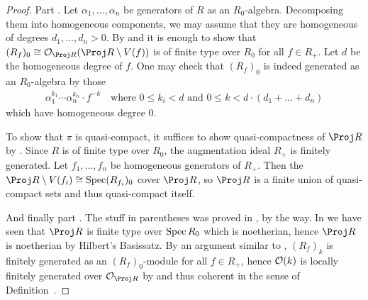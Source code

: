 \documentclass[a4paper,parskip=half,numbers=enddot, DIV=12]{scrreprt}
\renewcommand{\leq}{\leqslant}
\begin{document}
\begin{proof}
	Part . Let $\alpha_1,\ldots,\alpha_n$ be generators of $R$ as an $R_0$-algebra. Decomposing them into homogeneous components, we may assume that they are homogeneous of degrees $d_1,\ldots,d_n>0$. By \cite[Proposition~2.2.1]{alggeo1}  and  it is enough to show that $(R_f)_0\cong\Oo_{\Proj R}(\Proj R\setminus V(f))$ is of finite type over $R_0$ for all $f\in R_+$. Let $d$ be the homogeneous degree of $f$. One may check that $(R_f)_0$ is indeed generated as an $R_0$-algebra by those
	\begin{align*}
	\alpha_1^{k_1}\cdots \alpha_n^{k_n}\cdot f^{-k}\quad\text{where }0\leq k_i<d\text{ and }0\leq k<d\cdot(d_1+\ldots+d_n)
	\end{align*}
	which have homogeneous degree $0$. 
	
	To show that $\pi$ is quasi-compact, it suffices to show quasi-compactness of $\Proj R$ by \cite[Fact~2.1.2]{alggeo1}. Since $R$ is of finite type over $R_0$, the augmentation ideal $R_+$ is finitely generated. Let $f_1,\ldots,f_n$ be homogeneous generators of $R_+$. Then the $\Proj R\setminus V(f_i)\cong \Spec (R_{f_i})_0$ cover $\Proj R$, so $\Proj R$ is a finite union of quasi-compact sets and thus quasi-compact itself.
	
	And finally part . The stuff in parentheses was proved in \cite[Proposition~2.2.1]{alg2}, by the way. In  we have seen that $\Proj R$ is finite type over $\operatorname{Spec} R_0$ which is noetherian, hence $\Proj R$ is noetherian by Hilbert's Basissatz. By an argument similar to , $(R_f)_k$ is finitely generated as an $(R_f)_0$-module for all $f\in R_+$, hence $\mathcal{O}(k)$ is locally finitely generated over $\Oo_{\Proj R}$ by  and thus coherent in the sense of Definition~.
\end{proof}
\end{document}

